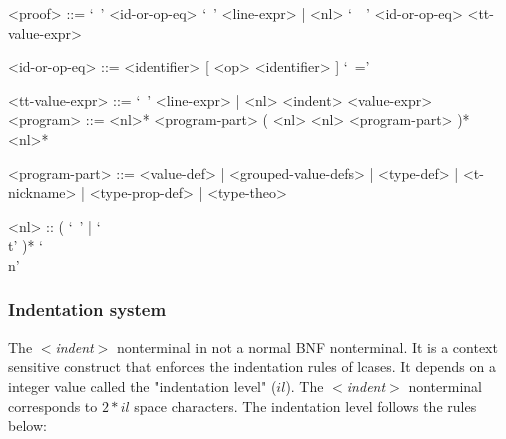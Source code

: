 \documentclass{article}
\begin{document}
\begin{grammar}
<proof> ::= 
`\ ' <id-or-op-eq> `\ ' <line-expr> | <nl> `\ \ ' <id-or-op-eq>  <tt-value-expr>

<id-or-op-eq> ::= <identifier> [ <op> <identifier> ] `\ ='

<tt-value-expr> ::= `\ ' <line-expr> | <nl> <indent> <value-expr>
\\

<program> ::=
<nl>* <program-part> ( <nl> <nl> <program-part> )* <nl>*

<program-part> ::=
<value-def> | <grouped-value-defs> | <type-def> | <t-nickname> | <type-prop-def> |
<type-theo>

<nl> :: ( `\ ' | `\\t' )* `\\n'
\end{grammar}

\subsubsection{Indentation system}
\label{subsubsec:indsys}

The \textit{$<$indent$>$} nonterminal in not a normal BNF nonterminal. It is a
context sensitive construct that enforces the indentation rules of lcases.
It depends on a integer value called the "indentation level" ($il$).
The \textit{$<$indent$>$} nonterminal corresponds to $2*il$ space characters.
The indentation level follows the rules below:
\end{document}
